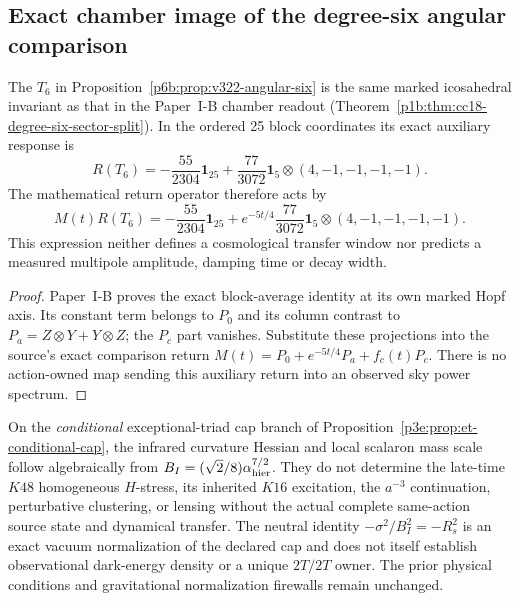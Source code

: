 \documentclass[12pt,a4paper]{article}
\begin{document}
\subsection{Exact chamber image of the degree-six angular comparison}
\label{p6b:sec:cc18-angular-chamber-bridge}
\begin{corollary}
\label{p6b:cor:cc18-degree-six-chamber-bridge}
The $T_6$ in Proposition~\ref{p6b:prop:v322-angular-six} is the
same marked icosahedral invariant as that in the
Paper~I-B chamber readout
(Theorem~\ref{p1b:thm:cc18-degree-six-sector-split}).  In the
ordered 25 block coordinates its exact auxiliary response is
\[
\boxed{R(T_6)=-\frac{55}{2304}\mathbf1_{25}
+\frac{77}{3072}\mathbf1_5\otimes(4,-1,-1,-1,-1).}
\]
The mathematical return operator therefore acts by
\[
\boxed{M(t)R(T_6)=-\frac{55}{2304}\mathbf1_{25}
+e^{-5t/4}\frac{77}{3072}\mathbf1_5\otimes(4,-1,-1,-1,-1).}
\]
This expression neither defines a cosmological transfer window nor
predicts a measured multipole amplitude, damping time or decay width.
\end{corollary}
\begin{proof}
Paper~I-B proves the exact block-average identity at its own
marked Hopf axis.  Its constant term belongs to $P_0$ and its
column contrast to $P_a=Z\otimes Y+Y\otimes Z$; the $P_c$ part
vanishes.  Substitute these projections into the source's exact
comparison return $M(t)=P_0+e^{-5t/4}P_a+f_c(t)P_c$.
There is no action-owned map sending this auxiliary return into an
observed sky power spectrum.
\end{proof}


\begin{remark}
\label{p6b:rem:et-k48-relic-scope}
On the \emph{conditional} exceptional-triad cap branch of
Proposition~\ref{p3e:prop:et-conditional-cap}, the infrared
curvature Hessian and local scalaron mass scale follow algebraically
from $B_I=(\sqrt2/8)\alpha_{\rm hier}^{7/2}$.
They do not determine the late-time $K48$ homogeneous $H$-stress,
its inherited $K16$ excitation, the $a^{-3}$ continuation,
perturbative clustering, or lensing without the actual complete
same-action source state and dynamical transfer.  The neutral
identity $-\sigma^2/B_I^2=-R_s^2$ is an exact vacuum
normalization of the declared cap and does not itself establish
observational dark-energy density or a unique $2T/2T$ owner.
The prior physical conditions and gravitational normalization
firewalls remain unchanged.
\end{remark}
\end{document}
